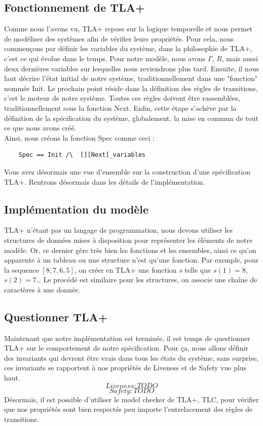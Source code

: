 \documentclass[runningheads]{llncs}
\begin{document}
\subsection{Fonctionnement de TLA+}
Comme nous l'avons vu, TLA+ repose sur la logique temporelle et nous permet de modéliser des systèmes afin de vérifier leurs propriétés.
Pour cela, nous commençons par définir les variables du système, dans la philosophie de TLA+, c'est ce qui évolue dans le temps. 
Pour notre modèle, nous avons $\Gamma$, $R$, mais aussi deux dernières variables sur lesquelles nous reviendrons plus tard.
Ensuite, il nous faut décrire l'état initial de notre système, traditionnellement dans une "fonction" nommée Init.
Le prochain point réside dans la définition des règles de transitions, c'est le moteur de notre système. 
Toutes ces règles doivent être rassemblées, traditionnellement sous la fonction Next. 
Enfin, cette étape s'achève par la définition de la spécification du système, globalement, la mise en commun de tout ce que nous avons créé.
\\Ainsi, nous créons la fonction Spec comme ceci :
\begin{verbatim}
    Spec == Init /\  [][Next]_variables
\end{verbatim}%
Vous avez désormais une vue d'ensemble sur la construction d'une spécification TLA+.
Rentrons désormais dans les détails de l'implémentation.


\subsection{Implémentation du modèle}
TLA+ n'étant pas un langage de programmation, nous devons utiliser les structures de données mises à disposition pour représenter les éléments de notre modèle.
Or, ce dernier gère très bien les fonctions et les ensembles, ainsi ce qu'on apparente à un tableau ou une structure n'est qu'une fonction.
Par exemple, pour la sequence $[8,7,6,5]$, on créer en TLA+ une fonction $s$ telle que $s(1) = 8$, $s(2) = 7$\dots
Le procédé est similaire pour les structures, on associe une chaîne de caractères à une donnée.


\subsection{Questionner TLA+}
Maintenant que notre implémentation est terminée, il est temps de questionner TLA+ sur le comportement de notre spécification.
Pour ça, nous allons définir des invariants qui devront être vrais dans tous les états du système, sans surprise, ces invariants 
se rapportent à nos propriétés de Liveness et de Safety vue plus haut.
$$Liveness : TODO$$
$$Safety : TODO$$
Désormais, il est possible d'utiliser le model checker de TLA+, TLC, pour vérifier que nos propriétés sont bien respectés
peu importe l'entrelacement des règles de transitions.
\end{document}

